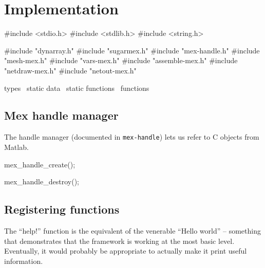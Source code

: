 \section{Implementation}

\nwenddocs{}\endmoddef
#include <stdio.h>
#include <stdlib.h>
#include <string.h>

#include "dynarray.h"
#include "sugarmex.h"
#include "mex-handle.h"
#include "mesh-mex.h"
#include "vars-mex.h"
#include "assemble-mex.h"
#include "netdraw-mex.h"
#include "netout-mex.h"

\LA{}types~{\nwtagstyle{}}\RA{}
\LA{}static data~{\nwtagstyle{}}\RA{}
\LA{}static functions~{\nwtagstyle{}}\RA{}
\LA{}functions~{\nwtagstyle{}}\RA{}
\nwendcode{}\nwdocspar


\subsection{Mex handle manager}

The handle manager (documented in {\tt{}mex-handle}) lets us refer to C
objects from Matlab.

\nwenddocs{}\endmoddef
mex_handle_create();
\nwendcode{}\nwdocspar

\nwenddocs{}\endmoddef
mex_handle_destroy();
\nwendcode{}\nwdocspar


\subsection{Registering functions}

The ``help!'' function is the equivalent of the venerable ``Hello world'' --
something that demonstrates that the framework is working at the most
basic level.  Eventually, it would probably be appropriate to actually
make it print useful information.

